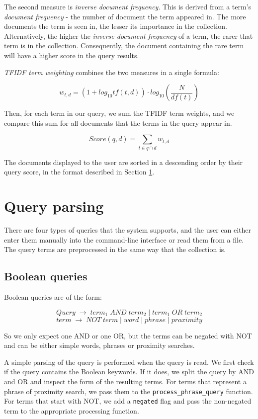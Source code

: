 \documentclass[11pt]{article}
\begin{document}
\begin{multicols}{2}
The second measure is \textit{inverse document frequency}. This is derived from a term's \textit{document frequency} - the number of document the term appeared in. The more documents the term is seen in, the lesser its importance in the collection. Alternatively, the higher the \textit{inverse document frequency} of a term, the rarer that term is in the collection. Consequently, the document containing the rare term will have a higher score in the query results.

\textit{TFIDF term weighting} combines the two measures in a single formula:

 \[w_{t,d} = (1 + log_{10}tf(t,d))\cdot log_{10}(\frac{N}{df(t)})\]

Then, for each term in our query, we sum the TFIDF term weights, and we compare this sum for all documents that the terms in the query appear in. 

\[Score(q,d) = \sum_{t\in q\cap d}w_{t,d}\]

The documents displayed to the user are sorted in a descending order by their query score, in the format described in Section \ref{parsing}.

\section{Query parsing} \label{parsing}
There are four types of queries that the system supports, and the user can either enter them manually into the command-line interface or read them from a file. The query terms are preprocessed in the same way that the collection is.

\subsection{Boolean queries}
Boolean queries are of the form:

\[Query \; \rightarrow \; term_1 \; AND \; term_2 \;|\; term_1 \; OR \; term_2\]
\[term \; \rightarrow \; NOT \; term \;|\;word \; | \; phrase \; | \; proximity\]

So we only expect one AND or one OR, but the terms can be negated with NOT and can be either simple words, phrases or proximity searches. 

A simple parsing of the query is performed when the query is read. We first check if the query contains the Boolean keywords. If it does, we split the query by AND and OR and inspect the form of the resulting terms. For terms that represent a phrase of proximity search, we pass them to the \verb!process_phrase_query! function. For terms that start with NOT, we add a \verb!negated! flag and pass the non-negated term to the appropriate processing function.


\end{multicols}
\end{document}
